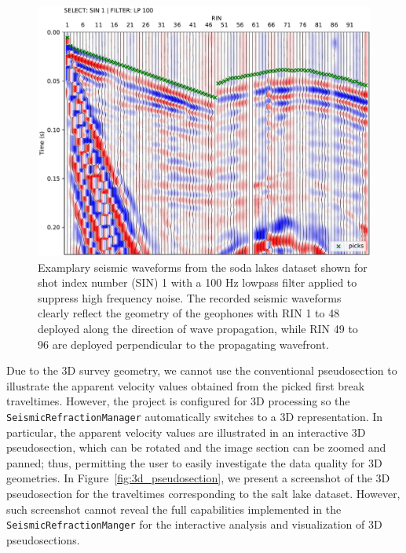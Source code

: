 \documentclass[a4paper,fleqn]{cas-sc}
\begin{document}
\begin{figure}
	\centering
	\includegraphics[width=.75\textwidth]{figures/sodalakes_sin1_lp100_picks_vd.pdf}
	\caption{Examplary seismic waveforms from the soda lakes dataset shown for shot index number (SIN) 1 with a 100 Hz lowpass filter applied to suppress high frequency noise. The recorded seismic waveforms clearly reflect the geometry of the geophones with RIN 1 to 48 deployed along the direction of wave propagation, while RIN 49 to 96 are deployed perpendicular to the propagating wavefront.}
	\label{fig:3d_pickwindow}
\end{figure}

Due to the 3D survey geometry, we cannot use the conventional pseudosection to illustrate the apparent velocity values obtained from the picked first break traveltimes.
However, the project is configured for 3D processing so the \texttt{SeismicRefractionManager} automatically switches to a 3D representation. In particular, the apparent velocity values are illustrated in an interactive 3D pseudosection, which can be rotated and the image section can be zoomed and panned; thus, permitting the user to easily investigate the data quality for 3D geometries. In Figure~\ref{fig:3d_pseudosection}, we present a screenshot of the 3D pseudosection for the traveltimes corresponding to the salt lake dataset. However, such screenshot cannot reveal the full capabilities implemented in the \texttt{SeismicRefractionManger} for the interactive analysis and visualization of 3D pseudosections.
\end{document}

